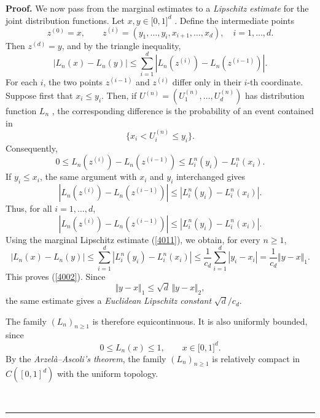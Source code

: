 \documentclass[onecolumn]{article}
\newenvironment{proof}[1][Proof]{\noindent\textbf{#1.} }{\ \rule{0.5em}{0.5em}}
\begin{document}
\begin{proof}
\noindent We now pass from the marginal estimates to a \textit{Lipschitz
estimate} for the joint distribution functions. Let $x,y\in \lbrack 0,1]^{d}$%
. Define the intermediate points 
\begin{equation}
z^{(0)}=x,\qquad z^{(i)}=(y_{1},\ldots ,y_{i},x_{i+1},\ldots ,x_{d}),\quad
i=1,\ldots ,d.  \label{4012}
\end{equation}%
Then $z^{(d)}=y$, and by the triangle inequality, 
\begin{equation}
|L_{n}(x)-L_{n}(y)|\leq \sum_{i=1}^{d}|L_{n}(z^{(i)})-L_{n}(z^{(i-1)})|.
\label{4013}
\end{equation}%
For each $i$, the two points $z^{(i-1)}$ and $z^{(i)}$ differ only in their $%
i$-th coordinate. Suppose first that $x_{i}\leq y_{i}$. Then, if $%
U^{(n)}=(U_{1}^{(n)},\ldots ,U_{d}^{(n)})$ has distribution function $L_{n}$%
, the corresponding difference is the probability of an event contained in 
\begin{equation}
\{x_{i}<U_{i}^{(n)}\leq y_{i}\}.  \label{4014}
\end{equation}%
Consequently, 
\begin{equation}
0\leq L_{n}(z^{(i)})-L_{n}(z^{(i-1)})\leq L_{i}^{n}(y_{i})-L_{i}^{n}(x_{i}).
\label{4015}
\end{equation}%
If $y_{i}\leq x_{i}$, the same argument with $x_{i}$ and $y_{i}$
interchanged gives 
\begin{equation}
|L_{n}(z^{(i)})-L_{n}(z^{(i-1)})|\leq |L_{i}^{n}(y_{i})-L_{i}^{n}(x_{i})|.
\label{4016}
\end{equation}%
Thus, for all $i=1,\ldots ,d$, 
\begin{equation}
|L_{n}(z^{(i)})-L_{n}(z^{(i-1)})|\leq |L_{i}^{n}(y_{i})-L_{i}^{n}(x_{i})|.
\label{4017}
\end{equation}%
Using the marginal Lipschitz estimate (\ref{4011}), we obtain, for every $%
n\geq 1$, 
\begin{equation}
|L_{n}(x)-L_{n}(y)|\leq
\sum_{i=1}^{d}|L_{i}^{n}(y_{i})-L_{i}^{n}(x_{i})|\leq \frac{1}{c_{d}}%
\sum_{i=1}^{d}|y_{i}-x_{i}|=\frac{1}{c_{d}}\Vert y-x\Vert _{1}.  \label{4018}
\end{equation}%
This proves (\ref{4002}). Since 
\begin{equation}
\Vert y-x\Vert _{1}\leq \sqrt{d}\,\Vert y-x\Vert _{2},  \label{4019}
\end{equation}%
the same estimate gives a \textit{Euclidean} \textit{Lipschitz constant} $%
\sqrt{d}/c_{d}$.

\noindent The family $(L_{n})_{n\geq 1}$ is therefore equicontinuous. It is
also uniformly bounded, since 
\begin{equation}
0\leq L_{n}(x)\leq 1,\qquad x\in \lbrack 0,1]^{d}.  \label{4020}
\end{equation}%
By the \textit{Arzel\`{a}--Ascoli's theorem}, the family $(L_{n})_{n\geq 1}$
is relatively compact in $C([0,1]^{d})$ with the uniform topology.


\end{proof}
\end{document}
